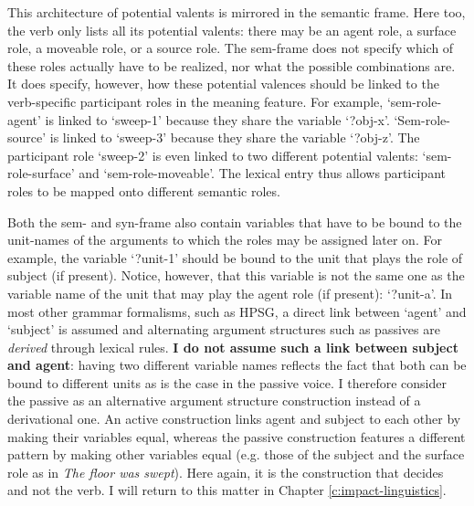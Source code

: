 This architecture of potential valents is mirrored in the semantic frame. Here too, the verb only lists all its potential valents: there may be an agent role, a surface role, a moveable role, or a source role. The sem-frame does not specify which of these roles actually have to be realized, nor what the possible combinations are. It does specify, however, how these potential valences should be linked to the verb-specific participant roles in the meaning feature. For example, `sem-role-agent' is linked to `sweep-1' because they share the variable `?obj-x'. `Sem-role-source' is linked to `sweep-3' because they share the variable `?obj-z'. The participant role `sweep-2' is even linked to two different potential valents: `sem-role-surface' and `sem-role-moveable'. The lexical entry thus allows participant roles to be mapped onto different semantic roles.

Both the sem- and syn-frame also contain variables that have to be bound to the unit-names of the arguments to which the roles may be assigned later on. For example, the variable `?unit-1' should be bound to the unit that plays the role of subject (if present). Notice, however, that this variable is not the same one as the variable name of the unit that may play the agent role (if present): `?unit-a'. In most other grammar formalisms, such as HPSG, a direct link between `agent' and `subject' is assumed and alternating argument structures such as passives are {\em derived} through lexical rules. {\bfseries I do not assume such a link between subject and agent}: having two different variable names reflects the fact that both can be bound to different units as is the case in the passive voice. I therefore consider the passive as an alternative argument structure construction instead of a derivational one. An active construction links agent and subject to each other by making their variables equal, whereas the passive construction features a different pattern by making other variables equal (e.g. those of the subject and the surface role as in {\em The floor was swept}). Here again, it is the construction that decides and not the verb. I will return to this matter in Chapter \ref{c:impact-linguistics}.

